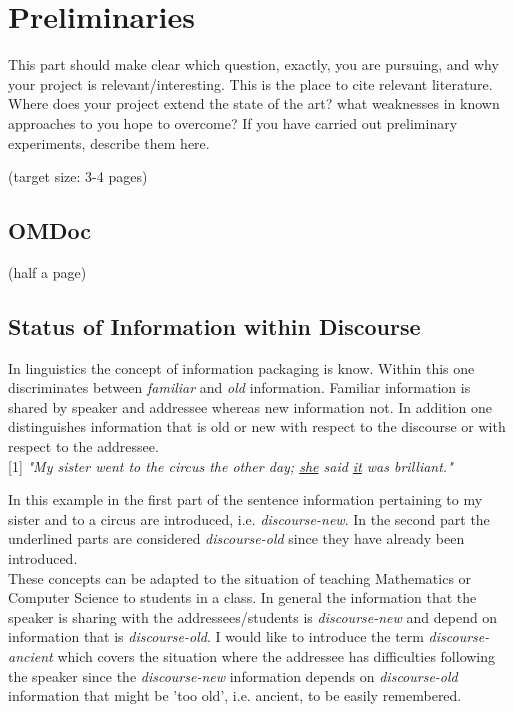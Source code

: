 \documentclass[twoside]{article}
\begin{document}

\newpage 
\section{Preliminaries}
  This part should make clear which question, exactly, you are
  pursuing, and why your project is relevant/interesting. This is the
  place to cite relevant literature. Where does your project extend
  the state of the art? what weaknesses in known approaches to you
  hope to overcome? If you have carried out preliminary experiments,
  describe them here.

(target size: 3-4 pages)

\subsection{OMDoc}
(half a page)
\vspace*{8cm}
\subsection{Status of Information within Discourse}

In linguistics the concept of information packaging is know. Within this one discriminates between \textit{familiar} and \textit{old} information. Familiar information is shared by speaker and addressee whereas new information not. In addition one distinguishes information that is old or new with respect to the discourse or with respect to the addressee.\\

[1] \textit{"My sister went to the circus the other day; \underline{she} said \underline{it} was brilliant."}

In this example in the first part of the sentence information pertaining to my sister and to a circus are introduced, i.e. \textit{discourse-new}. In the second part the underlined parts are considered \textit{discourse-old} since they have already been introduced.\cite{Cambridge}\\

These concepts can be adapted to the situation of teaching Mathematics or Computer Science to students in a class. In general the information that the speaker is sharing with the addressees/students is \textit{discourse-new} and depend on  information that is \textit{discourse-old}. I would like to introduce the term \textit{discourse-ancient} which covers the situation where the addressee has difficulties following the speaker since the \textit{discourse-new} information depends on \textit{discourse-old} information that might be 'too old', i.e. ancient, to be easily remembered.
\end{document}
